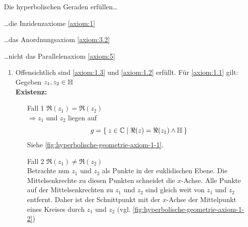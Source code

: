 \begin{bemerkung}
    Die hyperbolischen Geraden erfüllen\dots
    \begin{bemenum}
        \item \dots die Inzidenzaxiome \ref{axiom:1}
        \item \dots das Anordnungsaxiom \ref{axiom:3.2}
        \item \dots nicht das Parallelenaxiom \ref{axiom:5}
    \end{bemenum}
\end{bemerkung}

\begin{beweis}\leavevmode
    \begin{enumerate}[label=\alph*), ref=\theproposition (\alph*)]
        \item Offensichtlich sind \ref{axiom:1.3} und \ref{axiom:1.2}
              erfüllt. Für \ref{axiom:1.1} gilt:\\
              Gegeben $z_1, z_2 \in \mathbb{H}$\\
              \textbf{Existenz:}
            \begin{enumerate}
                \item[Fall 1] $\Re(z_1) = \Re(z_2)$\\
                    $\Rightarrow z_1$ und $z_2$ liegen auf
                    \[g = \Set{z \in \ensuremath{\mathbb{C}}| \Re(z) = \Re(z_1) \land \ensuremath{\mathbb{H}}}\]
                    Siehe \cref{fig:hyperbolische-geometrie-axiom-1-1}.
                \item[Fall 2] $\Re(z_1) \neq \Re(z_2)$\\
                    Betrachte nun $z_1$ und $z_2$ als Punkte in der
                    euklidischen Ebene. Die Mittelsenkrechte zu diesen
                    Punkten schneidet die $x$-Achse. Alle Punkte auf
                    der Mittelsenkrechten zu $z_1$ und $z_2$ sind gleich 
                    weit von $z_1$ und $z_2$ entfernt. Daher ist
                    der Schnittpunkt mit der $x$-Achse der Mittelpunkt
                    eines Kreises durch $z_1$ und $z_2$ (vgl. \cref{fig:hyperbolische-geometrie-axiom-1-2})
            \end{enumerate}


\end{enumerate}
\end{beweis}
